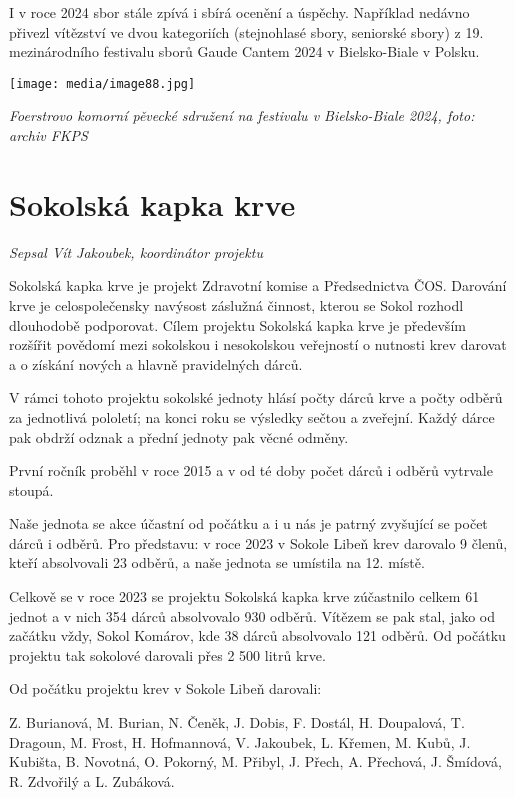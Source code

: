 I v roce 2024 sbor stále zpívá i sbírá ocenění a úspěchy. Například
nedávno přivezl vítězství ve dvou kategoriích (stejnohlasé sbory,
seniorské sbory) z 19. mezinárodního festivalu sborů Gaude Cantem 2024 v
Bielsko-Biale v Polsku.

\texttt{[image: media/image88.jpg]}

\emph{Foerstrovo komorní pěvecké sdružení na festivalu v Bielsko-Biale
2024, foto: archiv FKPS}

\section{Sokolská kapka krve}\label{sokolskuxe1-kapka-krve}

\emph{Sepsal Vít Jakoubek, koordinátor projektu}

Sokolská kapka krve je projekt Zdravotní komise a Předsednictva ČOS.
Darování krve je celospolečensky navýsost záslužná činnost, kterou se
Sokol rozhodl dlouhodobě podporovat. Cílem projektu Sokolská kapka krve
je především rozšířit povědomí mezi sokolskou i nesokolskou veřejností o
nutnosti krev darovat a o získání nových a hlavně pravidelných dárců.

V rámci tohoto projektu sokolské jednoty hlásí počty dárců krve a počty
odběrů za jednotlivá pololetí; na konci roku se výsledky sečtou a
zveřejní. Každý dárce pak obdrží odznak a přední jednoty pak věcné
odměny.

První ročník proběhl v roce 2015 a v od té doby počet dárců i odběrů
vytrvale stoupá.

Naše jednota se akce účastní od počátku a i u nás je patrný zvyšující se
počet dárců i odběrů. Pro představu: v roce 2023 v Sokole Libeň krev
darovalo 9 členů, kteří absolvovali 23 odběrů, a naše jednota se
umístila na 12. místě.

Celkově se v roce 2023 se projektu Sokolská kapka krve zúčastnilo celkem
61 jednot a v nich 354 dárců absolvovalo 930 odběrů. Vítězem se pak
stal, jako od začátku vždy, Sokol Komárov, kde 38 dárců absolvovalo 121
odběrů. Od počátku projektu tak sokolové darovali přes 2 500 litrů krve.

Od počátku projektu krev v Sokole Libeň darovali:

Z. Burianová, M. Burian, N. Čeněk, J. Dobis, F. Dostál, H. Doupalová, T.
Dragoun, M. Frost, H. Hofmannová, V. Jakoubek, L. Křemen, M. Kubů, J.
Kubišta, B. Novotná, O. Pokorný, M. Přibyl, J. Přech, A. Přechová, J.
Šmídová, R. Zdvořilý a L. Zubáková.

